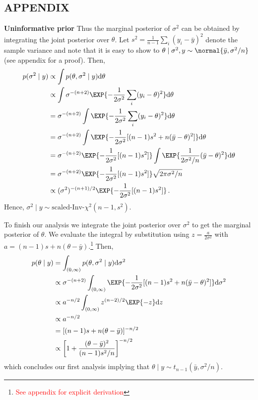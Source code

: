 \subsection{APPENDIX}

\textbf{Uninformative prior}
Thus the marginal posterior of $\sigma^2$ can be obtained by integrating the joint posterior
over $\theta$. Let $s^2 = \frac{1}{n-1} \sum_i (y_i - \bar{y})^2$ denote the sample
variance and note that it is easy to show to
$\theta \mid \sigma^2, y \sim \normal{\bar{y}, \sigma^2/n}$ (see appendix for a proof).
Then,
\begin{align}
  p(\sigma^2 \mid y) &\propto \int p(\theta, \sigma^2 \mid y) \mathrm{d} \theta\\
  &\propto \int \sigma^{-(n+2)} \EXP{-\frac{1}{2\sigma^2}\sum_i (y_i - \theta)^2} \mathrm{d} \theta\\
  &= \sigma^{-(n+2)} \int \EXP{-\frac{1}{2\sigma^2}\sum_i (y_i - \theta)^2} \mathrm{d} \theta\\
  &= \sigma^{-(n+2)} \int \EXP{-\frac{1}{2\sigma^2}[(n-1) s^2 + n(\bar{y} - \theta)^2]} \mathrm{d} \theta\\
  &= \sigma^{-(n+2)} \EXP{-\frac{1}{2\sigma^2}[(n-1) s^2]} \int \EXP{\frac{1}{2\sigma^2/n}(\bar{y} - \theta)^2} \mathrm{d} \theta\\
  &= \sigma^{-(n+2)} \EXP{-\frac{1}{2\sigma^2}[(n-1) s^2]} \sqrt{2 \pi \sigma^2 / n} \\
  &\propto (\sigma^2)^{-(n+1)/2} \EXP{-\frac{1}{2\sigma^2}[(n-1) s^2]} \,.
\end{align}
Hence, $\sigma^2 \mid y \sim \text{scaled-Inv-} \chi^2(n-1, s^2)$.

To finish our analysis we integrate the joint posterior over $\sigma^2$ to get
the marginal posterior of $\theta$. We evaluate the integral by substitution using
$z = \frac{a}{2 \sigma^2}$ with $a = (n-1)s + n(\theta - \bar{y})$.\footnote{\textcolor{red}{See appendix for explicit derivation}}
Then,
\begin{align}
  p(\theta \mid y) &= \int_{(0, \infty)} p(\theta, \sigma^2 \mid y) \mathrm{d}\sigma^2\\
  &\propto \sigma^{-(n+2)} \int_{(0, \infty)} \EXP{-\frac{1}{2\sigma^2}[(n-1) s^2 + n(\bar{y} - \theta)^2]} \mathrm{d} \sigma^2\\
  &\propto a^{-n/2} \int_{(0, \infty)} z^{(n-2)/2}\EXP{-z} \mathrm{d}z\\
  &\propto a^{-n/2}\\
  &= [(n-1)s + n(\theta - \bar{y})]^{-n/2}\\
  &\propto \left[1 + \frac{(\theta - \bar{y})^2}{(n-1) s^2 / n}\right]^{-n/2} \,
\end{align}
which concludes our first analysis implying that $\theta \mid y \sim t_{n-1}(\bar{y}, \sigma^2/n)$.




